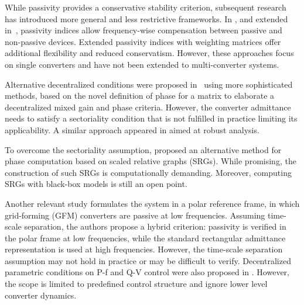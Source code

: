 While passivity provides a conservative stability criterion, subsequent research has introduced more general and less restrictive frameworks.  In \cite{chenExtendedFrequencyDomainPassivity2025a}, and extended in~\cite{chenUnifiedFlexibleFrequencyDomain2025a}, passivity indices allow frequency-wise compensation between passive and non-passive devices. Extended passivity indices with weighting matrices offer additional flexibility and reduced conservatism. However, these approaches focus on single converters and have not been extended to multi-converter systems.

Alternative decentralized conditions were proposed in~\cite{huangGainPhaseDecentralized2024} using more sophisticated methods, based on the novel definition of phase for a matrix to elaborate a decentralized mixed gain and phase criteria. However, the converter admittance needs to satisfy a sectoriality condition that is not fulfilled in practice
limiting its applicability. A similar approach appeared in \cite{woolcockMixedGainPhase2023} aimed at robust analysis.

To overcome the sectoriality assumption, \cite{baron2025decentralized} proposed an alternative method for phase computation based on scaled relative graphs (SRGs). While promising, the construction of such SRGs is computationally demanding. Moreover, computing SRGs with black-box models is still an open point.

Another relevant study \cite{deyPassivityBasedDecentralizedCriteria2023} formulates the system in a polar reference frame, in which grid-forming (GFM) converters are passive at low frequencies. Assuming time-scale separation, the authors propose a hybrid criterion: passivity is verified in the polar frame at low frequencies, while the standard rectangular admittance representation is used at high frequencies. However, the time-scale separation assumption may not hold in practice or may be difficult to verify. Decentralized parametric conditions on P-f and Q-V control were also proposed in \cite{häberle2025decentralizedparametricstabilitycertificates}. However, the scope is limited to predefined control structure and ignore lower level converter dynamics.

